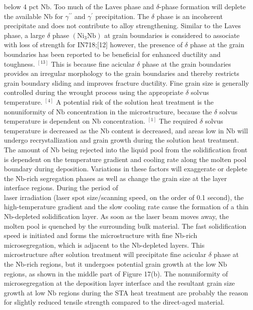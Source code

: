 \documentclass[10pt]{article}
\begin{document}
below 4 pct $\mathrm{Nb}$. Too much of the Laves phase and $\delta$-phase formation will deplete the available $\mathrm{Nb}$ for $\gamma^{\prime \prime}$ and $\gamma^{\prime}$ precipitation. The $\delta$ phase is an incoherent precipitate and does not contribute to alloy strengthening. Similar to the Laves phase, a large $\delta$ phase $\left(\mathrm{Ni}_{3} \mathrm{Nb}\right)$ at grain boundaries is considered to associate with loss of strength for IN718;[12] however, the presence of $\delta$ phase at the grain boundaries has been reported to be beneficial for enhanced ductility and toughness. ${ }^{[13]}$ This is because fine acicular $\delta$ phase at the grain boundaries provides an irregular morphology to the grain boundaries and thereby restricts grain boundary sliding and improves fracture ductility. Fine grain size is generally controlled during the wrought process using the appropriate $\delta$ solvus temperature. ${ }^{[4]}$ A potential risk of the solution heat treatment is the nonuniformity of $\mathrm{Nb}$ concentration in the microstructure, because the $\delta$ solvus temperature is dependent on $\mathrm{Nb}$ concentration. ${ }^{[1]}$ The required $\delta$ solvus temperature is decreased as the $\mathrm{Nb}$ content is decreased, and areas low in $\mathrm{Nb}$ will undergo recrystallization and grain growth during the solution heat treatment. The amount of $\mathrm{Nb}$ being rejected into the liquid pool from the solidification front is dependent on the temperature gradient and cooling rate along the molten pool boundary during deposition. Variations in these factors will exaggerate or deplete the $\mathrm{Nb}$-rich segregation phases as well as change the grain size at the layer interface regions. During the period of\\
laser irradiation (laser spot size/scanning speed, on the order of 0.1 second), the high-temperature gradient and the slow cooling rate cause the formation of a thin $\mathrm{Nb}$-depleted solidification layer. As soon as the laser beam moves away, the molten pool is quenched by the surrounding bulk material. The fast solidification speed is initiated and forms the microstructure with fine $\mathrm{Nb}$-rich microsegregation, which is adjacent to the $\mathrm{Nb}$-depleted layers. This microstructure after solution treatment will precipitate fine acicular $\delta$ phase at the $\mathrm{Nb}$-rich regions, but it undergoes potential grain growth at the low $\mathrm{Nb}$ regions, as shown in the middle part of Figure 17(b). The nonuniformity of microsegregation at the deposition layer interface and the resultant grain size growth at low $\mathrm{Nb}$ regions during the STA heat treatment are probably the reason for slightly reduced tensile strength compared to the direct-aged material.
\end{document}
